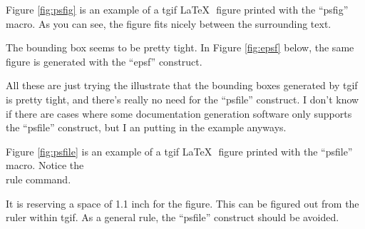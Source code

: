%
%
%
\oddsidemargin=0in
\textwidth=6.5in
\topmargin=0in
\textheight=609pt
\parskip=14pt
\setlength{\unitlength}{0.5cm}

%
Figure \ref{fig:psfig} is an example of a tgif \LaTeX\,\, figure printed with
the ``psfig'' macro.  As you can see, the figure fits nicely between the
surrounding text.
%
\begin{figure*}[htb]

\centerline{}
\caption{Example Tgif Diagram Printed with ``psfig'' Macro.\label{fig:psfig}}
\end{figure*}
%
The bounding box seems to be pretty tight.  In
Figure \ref{fig:epsf} below, the same figure is
generated with the ``epsf'' construct.
%
\begin{figure*}[htb]

\centerline{}
\caption{Example Tgif Diagram Printed with ``epsf'' Macro.\label{fig:epsf}}
\end{figure*}
%
All these are just trying the illustrate that the bounding boxes
generated by tgif is pretty tight, and there's really no need for
the ``psfile'' construct.  I don't know if there are cases where
some documentation generation software only supports the ``psfile''
construct, but I an putting in the example anyways.

Figure \ref{fig:psfile} is an example of a tgif \LaTeX\,\, figure
printed with the ``psfile'' macro.  Notice the \\rule command.
%
\begin{figure*}[htb]
\rule{0in}{1.1in}
\caption{Example Tgif Diagram Printed with ``psfile'' Macro.\label{fig:psfile}}
\end{figure*}
%
It is reserving a space of 1.1 inch for the figure.  This can
be figured out from the ruler within tgif.  As a general rule,
the ``psfile'' construct should be avoided.


